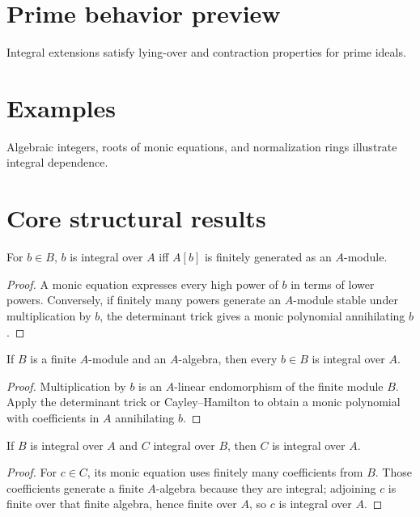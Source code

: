 \section{Prime behavior preview}
Integral extensions satisfy lying-over and contraction properties for prime ideals.

\section{Examples}
Algebraic integers, roots of monic equations, and normalization rings illustrate integral dependence.

\section{Core structural results}

\begin{theorem}\label{thm:v19-01}
For $b\in B$, $b$ is integral over $A$ iff $A[b]$ is finitely generated as an $A$-module.
\begin{proof}
A monic equation expresses every high power of $b$ in terms of lower powers. Conversely, if finitely many powers generate an $A$-module stable under multiplication by $b$, the determinant trick gives a monic polynomial annihilating $b$.
\end{proof}
\end{theorem}

\begin{theorem}\label{thm:v19-02}
If $B$ is a finite $A$-module and an $A$-algebra, then every $b\in B$ is integral over $A$.
\begin{proof}
Multiplication by $b$ is an $A$-linear endomorphism of the finite module $B$. Apply the determinant trick or Cayley--Hamilton to obtain a monic polynomial with coefficients in $A$ annihilating $b$.
\end{proof}
\end{theorem}

\begin{theorem}\label{thm:v19-03}
If $B$ is integral over $A$ and $C$ integral over $B$, then $C$ is integral over $A$.
\begin{proof}
For $c\in C$, its monic equation uses finitely many coefficients from $B$. Those coefficients generate a finite $A$-algebra because they are integral; adjoining $c$ is finite over that finite algebra, hence finite over $A$, so $c$ is integral over $A$.
\end{proof}
\end{theorem}

